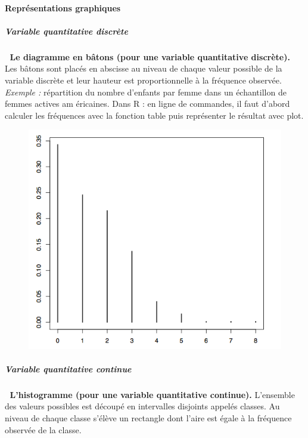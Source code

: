 \paragraph{Représentations graphiques} 
\subparagraph{Variable quantitative discrète}\textcolor{white}{.}\newline
\textbf{Le diagramme en bâtons (pour une variable quantitative discrète).}
Les bâtons sont placés en abscisse au niveau de chaque valeur possible de la variable discrète et leur hauteur est proportionnelle à la fréquence observée.\newline
\textit{Exemple : } répartition du nombre d'enfants par femme dans un  échantillon de femmes actives am éricaines. Dans R : en ligne de commandes, il faut d'abord calculer les fréquences avec la fonction table puis représenter le résultat avec plot.
\begin{figure}[H]\begin{center}\includegraphics[scale=0.7]{ilu/ccm9.png}\end{center}\end{figure}
\subparagraph{Variable quantitative continue}\textcolor{white}{.}\newline
\textbf{L'histogramme (pour une variable quantitative continue).}\newline
L'ensemble des valeurs possibles est découpé en intervalles disjoints appelés classes. Au niveau de chaque classe s'élève un rectangle dont l'aire est égale à la fréquence observée de la classe.\newline
